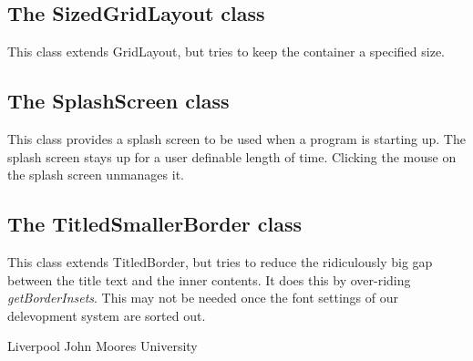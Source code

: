 \documentclass[10pt,a4paper]{article}
\begin{document}
\subsection{The SizedGridLayout class}
This class extends GridLayout, but tries to keep the container a specified size.

\subsection{The SplashScreen class}
This class provides a splash screen to be used when a program is starting up.
The splash screen stays up for a user definable length of time.
Clicking the mouse on the splash screen unmanages it.

\subsection{The TitledSmallerBorder class}
This class extends TitledBorder, but tries to reduce the ridiculously big gap between
the title text and the inner contents. It does this by over-riding {\em getBorderInsets}.
This may not be needed once the font settings of our delevopment system are sorted out.

\begin{thebibliography}{99}
Liverpool John Moores University 
\end{thebibliography}
\end{document}
